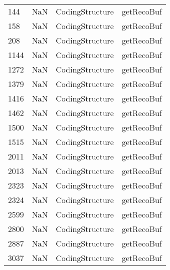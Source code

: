\begin{tabular}{llll}
144  &                   NaN &            CodingStructure &                                getRecoBuf \\
158  &                   NaN &            CodingStructure &                                getRecoBuf \\
208  &                   NaN &            CodingStructure &                                getRecoBuf \\
1144 &                   NaN &            CodingStructure &                                getRecoBuf \\
1272 &                   NaN &            CodingStructure &                                getRecoBuf \\
1379 &                   NaN &            CodingStructure &                                getRecoBuf \\
1416 &                   NaN &            CodingStructure &                                getRecoBuf \\
1462 &                   NaN &            CodingStructure &                                getRecoBuf \\
1500 &                   NaN &            CodingStructure &                                getRecoBuf \\
1515 &                   NaN &            CodingStructure &                                getRecoBuf \\
2011 &                   NaN &            CodingStructure &                                getRecoBuf \\
2013 &                   NaN &            CodingStructure &                                getRecoBuf \\
2323 &                   NaN &            CodingStructure &                                getRecoBuf \\
2324 &                   NaN &            CodingStructure &                                getRecoBuf \\
2599 &                   NaN &            CodingStructure &                                getRecoBuf \\
2800 &                   NaN &            CodingStructure &                                getRecoBuf \\
2887 &                   NaN &            CodingStructure &                                getRecoBuf \\
3037 &                   NaN &            CodingStructure &                                getRecoBuf \\

\end{tabular}
